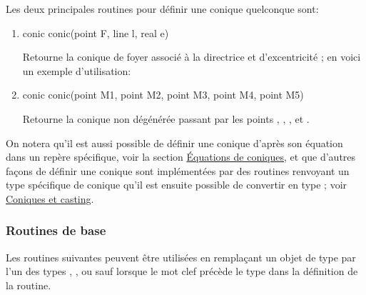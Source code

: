 \documentclass[pdftex]{article}
\begin{document}
Les deux principales routines pour définir une conique quelconque sont:

\begin{enumerate}
\item {}
    \begin{Vcolor}
    conic conic(point F, line l, real e)
  \end{Vcolor}
  Retourne la conique de foyer  associé à la
  directrice  et d'excentricité ; en voici un exemple d'utilisation:
\item {}
  \begin{Vcolor}
    conic conic(point M1, point M2, point M3, point M4, point M5)
  \end{Vcolor}
  Retourne la conique non dégénérée passant par les
  points , , ,  et .
\end{enumerate}
On notera qu'il est aussi possible de définir une conique d'après son équation dans
un repère spécifique, voir la section \href{#subsection.bqe}{Équations
  de coniques}, et que d'autres façons de définir une conique sont
implémentées par des routines renvoyant un type spécifique de conique
qu'il est ensuite possible de convertir en type ; voir
\href{#subsubsection.castingconic}{Coniques et \og{}casting\fg{}}.

\subsubsection{Routines de base}
Les routines suivantes peuvent être utilisées en remplaçant un objet
de type  par l'un des types , ,
 ou  sauf lorsque le mot clef
 précède le type  dans la définition de la
routine.
\end{document}
